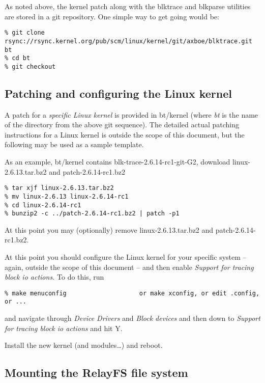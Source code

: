 \documentclass{article}
\begin{document}
As noted above, the kernel patch along with the blktrace and blkparse utilities are stored in a git repository. One simple way to get going would be:

\begin{verbatim}
% git clone rsync://rsync.kernel.org/pub/scm/linux/kernel/git/axboe/blktrace.git bt
% cd bt
% git checkout
\end{verbatim}

\subsection{\label{sec:patching}Patching and configuring the Linux kernel}

A patch for a \emph{specific Linux kernel} is provided in bt/kernel (where
\emph{bt} is the name of the directory from the above git sequence). The
detailed actual patching instructions for a Linux kernel is outside the
scope of this document, but the following may be used as a sample template.

As an example, bt/kernel contains blk-trace-2.6.14-rc1-git-G2, download
linux-2.6.13.tar.bz2 and patch-2.6.14-rc1.bz2

\begin{verbatim}
% tar xjf linux-2.6.13.tar.bz2 
% mv linux-2.6.13 linux-2.6.14-rc1
% cd linux-2.6.14-rc1
% bunzip2 -c ../patch-2.6.14-rc1.bz2 | patch -p1
\end{verbatim}

At this point you may (optionally) remove linux-2.6.13.tar.bz2 and
patch-2.6.14-rc1.bz2.

At this point you should configure the Linux kernel for your specific
system -- again, outside the scope of this document -- and then enable
\emph{Support for tracing block io actions.} To do this, run

\begin{verbatim}
% make menuconfig                    or make xconfig, or edit .config, or ...
\end{verbatim}

and navigate through \emph{Device Drivers} and \emph{Block devices}
and then down to \emph{Support for tracing block io actions} and hit Y.

Install the new kernel (and modules\ldots) and reboot. 

\subsection{\label{sec:mount}Mounting the RelayFS file system}
\end{document}
